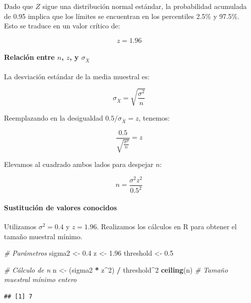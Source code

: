 \documentclass[
]{article}
\newenvironment{Shaded}{\begin{snugshade}}{\end{snugshade}}
\newcommand{\CommentTok}[1]{\textcolor[rgb]{0.56,0.35,0.01}{\textit{#1}}}
\newcommand{\DecValTok}[1]{\textcolor[rgb]{0.00,0.00,0.81}{#1}}
\newcommand{\FloatTok}[1]{\textcolor[rgb]{0.00,0.00,0.81}{#1}}
\newcommand{\FunctionTok}[1]{\textcolor[rgb]{0.13,0.29,0.53}{\textbf{#1}}}
\newcommand{\NormalTok}[1]{#1}
\newcommand{\OtherTok}[1]{\textcolor[rgb]{0.56,0.35,0.01}{#1}}
\newcommand{\SpecialCharTok}[1]{\textcolor[rgb]{0.81,0.36,0.00}{\textbf{#1}}}
\begin{document}
Dado que \(Z\) sigue una distribución normal estándar, la probabilidad acumulada de 0.95 implica que los límites se encuentran en los percentiles 2.5\% y 97.5\%. Esto se traduce en un valor crítico de:

\[
z = 1.96
\]

\paragraph{\texorpdfstring{Relación entre \(n\), \(z\), y \(\sigma_{\bar{X}}\)}{Relación entre n, z, y \textbackslash sigma\_\{\textbackslash bar\{X\}\}}}\label{relaciuxf3n-entre-n-z-y-sigma_barx}

La desviación estándar de la media muestral es:

\[
\sigma_{\bar{X}} = \sqrt{\frac{\sigma^2}{n}}
\]

Reemplazando en la desigualdad \(0.5 / \sigma_{\bar{X}} = z\), tenemos:

\[
\frac{0.5}{\sqrt{\frac{\sigma^2}{n}}} = z
\]

Elevamos al cuadrado ambos lados para despejar \(n\):

\[
n = \frac{\sigma^2 z^2}{0.5^2}
\]

\paragraph{Sustitución de valores conocidos}\label{sustituciuxf3n-de-valores-conocidos}

Utilizamos \(\sigma^2 = 0.4\) y \(z = 1.96\). Realizamos los cálculos en R para obtener el tamaño muestral mínimo.

\begin{Shaded}
\begin{Highlighting}[]
\CommentTok{\# Parámetros}
\NormalTok{sigma2 }\OtherTok{\textless{}{-}} \FloatTok{0.4}
\NormalTok{z }\OtherTok{\textless{}{-}} \FloatTok{1.96}
\NormalTok{threshold }\OtherTok{\textless{}{-}} \FloatTok{0.5}

\CommentTok{\# Cálculo de n}
\NormalTok{n }\OtherTok{\textless{}{-}}\NormalTok{ (sigma2 }\SpecialCharTok{*}\NormalTok{ z}\SpecialCharTok{\^{}}\DecValTok{2}\NormalTok{) }\SpecialCharTok{/}\NormalTok{ threshold}\SpecialCharTok{\^{}}\DecValTok{2}
\FunctionTok{ceiling}\NormalTok{(n) }\CommentTok{\# Tamaño muestral mínimo entero}
\end{Highlighting}
\end{Shaded}

\begin{verbatim}
## [1] 7
\end{verbatim}
\end{document}

